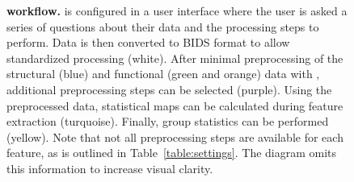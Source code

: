\begin{figure}[!tb]
\begin{adjustwidth}{-2.4cm}{}
        \caption{\textbf{ workflow.}  is configured in a user interface where the user is asked a series of questions about their data and the processing steps to perform. Data is then converted to BIDS format \parencite{gorgolewski2016b} to allow standardized processing (white). After minimal preprocessing of the structural (blue) and functional (green and orange) data with  \parencite{esteban2019a}, additional preprocessing steps can be selected (purple). Using the preprocessed data, statistical maps can be calculated during feature extraction (turquoise). Finally, group statistics can be performed (yellow). Note that not all preprocessing steps are available for each feature, as is outlined in Table~\ref{table:settings}. The diagram omits this information to increase visual clarity.}\label{fig:workflow}
  \end{adjustwidth}
\end{figure}
